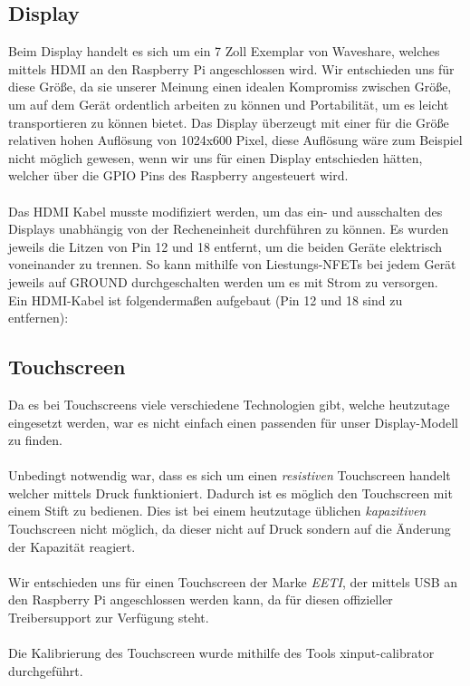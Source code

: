 \subsection{Display}

Beim Display handelt es sich um ein 7 Zoll Exemplar von Waveshare, welches mittels HDMI an den Raspberry Pi angeschlossen wird. Wir entschieden uns für diese Größe, da sie unserer Meinung einen idealen Kompromiss zwischen Größe, um auf dem Gerät ordentlich arbeiten zu können und Portabilität, um es leicht transportieren zu können bietet. Das Display überzeugt mit einer für die Größe relativen hohen Auflösung von 1024x600 Pixel, diese Auflösung wäre zum Beispiel nicht möglich gewesen, wenn wir uns für einen Display entschieden hätten, welcher über die GPIO Pins des Raspberry angesteuert wird.\\
\\
Das HDMI Kabel musste modifiziert werden, um das ein- und ausschalten des Displays unabhängig von der Recheneinheit durchführen zu können. Es wurden jeweils die Litzen von Pin 12 und 18 entfernt, um die beiden Geräte elektrisch voneinander zu trennen. So kann mithilfe von Liestungs-NFETs bei jedem Gerät jeweils auf GROUND durchgeschalten werden um es mit Strom zu versorgen.\\

Ein HDMI-Kabel ist folgendermaßen aufgebaut (Pin 12 und 18 sind zu entfernen): 

\subsection{Touchscreen}

Da es bei Touchscreens viele verschiedene Technologien gibt, welche heutzutage eingesetzt werden, war es nicht einfach einen passenden für unser Display-Modell zu finden.\\
\\
Unbedingt notwendig war, dass es sich um einen \textit{resistiven} Touchscreen handelt welcher mittels Druck funktioniert. Dadurch ist es möglich den Touchscreen mit einem Stift zu bedienen. Dies ist bei einem heutzutage üblichen \textit{kapazitiven} Touchscreen nicht möglich, da dieser nicht auf Druck sondern auf die Änderung der Kapazität reagiert.\\
\\
Wir entschieden uns für einen Touchscreen der Marke \textit{EETI}, der mittels USB an den Raspberry Pi angeschlossen werden kann, da für diesen offizieller Treibersupport zur Verfügung steht.\\
\\
Die Kalibrierung des Touchscreen wurde mithilfe des Tools xinput-calibrator durchgeführt.
